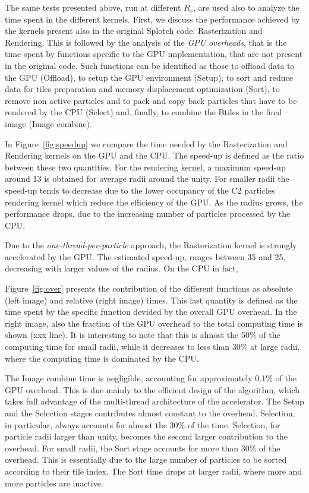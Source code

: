 \documentclass[1p]{elsarticle}
\begin{document}
\noindent
The same tests presented above, run at different $R_s$, are used also to
analyze the 
time spent in the different kernels. First, we discuss the performance 
achieved by the kernels present also in the original Splotch code: Rasterization and
Rendering.
This is followed by the analysis of the  
{\it GPU overheads}, that is the time spent by functions specific
to the GPU implementation, that are not present in the original code. Such functions can 
be identified as those to offload data to the GPU (Offload),
to setup the GPU environment (Setup),
to sort and reduce data for tiles preparation and memory displacement optimization (Sort),
to remove non active particles and to pack and copy back particles that have to 
be rendered by the CPU (Select) and, finally,
to combine the Btiles in the final image (Image combine).   

In Figure~\ref{fig:speedup} we compare the time needed by the Rasterization and Rendering
kernels on the GPU and the CPU. The speed-up is defined as the ratio between these two
quantities. For the rendering kernel, a maximum speed-up around 13 is obtained for
average radii around the unity. For smaller radii the speed-up tends to decrease due 
to the lower occupancy of the C2 particles rendering kernel which reduce the efficiency of the GPU.
As the radius grows, the performance drops, due to the increasing number of particles
processed by the CPU.    

Due to the {\it one-thread-per-particle} approach, the Rasterization kernel is strongly
accelerated by the GPU. The estimated speed-up, ranges between 35 and 25, decreasing 
with larger values of the radius. On the CPU in fact,  

Figure~\ref{fig:over} presents the contribution of the different functions
as absolute (left image) and relative (right image) times. This last 
quantity is defined as the time spent by the specific function devided by
the overall GPU overhead. In the right image, also the fraction of the GPU
overhead to the total computing time is shown (xxx line). It is interesting to 
note that this is almost the 50\% of the computing time for small radii,
while it decreases to less than 30\% at large radii, where the
computing time is dominated by the CPU. 

The Image combine time is negligible, accounting for approximately 0.1\% of 
the GPU overhead. This is due mainly to the efficient design of the 
algorithm, which takes full advantage of the multi-thread architecture 
of the accelerator. The Setup and the Selection stages contributes 
almost constant to the overhead. Selection, in particular, 
always accounts for almost the 30\% of the time.
Selection, for particle radii larger than unity, becomes the second 
larger contribution to the overhead. For small radii, the Sort
stage accounts for more than 30\% of the overhead. This is essentially due to 
the large number of particles to be sorted according to their tile index. 
The Sort time drops at larger radii, where more and more particles are
inactive.
 
\end{document}
